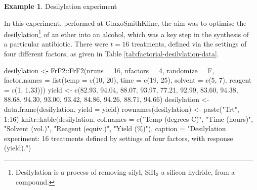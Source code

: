\documentclass[
]{book}
\newenvironment{Shaded}{\begin{snugshade}}{\end{snugshade}}
\newcommand{\AttributeTok}[1]{\textcolor[rgb]{0.77,0.63,0.00}{#1}}
\newcommand{\DecValTok}[1]{\textcolor[rgb]{0.00,0.00,0.81}{#1}}
\newcommand{\FloatTok}[1]{\textcolor[rgb]{0.00,0.00,0.81}{#1}}
\newcommand{\FunctionTok}[1]{\textcolor[rgb]{0.00,0.00,0.00}{#1}}
\newcommand{\NormalTok}[1]{#1}
\newcommand{\OtherTok}[1]{\textcolor[rgb]{0.56,0.35,0.01}{#1}}
\newcommand{\SpecialCharTok}[1]{\textcolor[rgb]{0.00,0.00,0.00}{#1}}
\newcommand{\StringTok}[1]{\textcolor[rgb]{0.31,0.60,0.02}{#1}}
\theoremstyle{definition}
\theoremstyle{definition}
\newtheorem{example}{Example}[chapter]
\theoremstyle{definition}
\theoremstyle{definition}
\theoremstyle{remark}
\begin{document}
\begin{example}
\protect\hypertarget{exm:factorial-desilylation}{}\label{exm:factorial-desilylation}Desilylation experiment \citep{Owen2001}

In this experiment, performed at GlaxoSmithKline, the aim was to optimise the desilylation\footnote{Desilylation is a process of removing silyl, SiH\(_3\) a silicon hydride, from a compound.} of an ether into an alcohol, which was a key step in the synthesis of a particular antibiotic. There were \(t=16\) treatments, defined via the settings of four different factors, as given in Table \ref{tab:factorial-desilylation-data}.

\begin{Shaded}
\begin{Highlighting}[]
\NormalTok{desilylation }\OtherTok{\textless{}{-}}\NormalTok{ FrF2}\SpecialCharTok{::}\FunctionTok{FrF2}\NormalTok{(}\AttributeTok{nruns =} \DecValTok{16}\NormalTok{, }\AttributeTok{nfactors =} \DecValTok{4}\NormalTok{, }\AttributeTok{randomize =}\NormalTok{ F,}
                           \AttributeTok{factor.names =} \FunctionTok{list}\NormalTok{(}\AttributeTok{temp =} \FunctionTok{c}\NormalTok{(}\DecValTok{10}\NormalTok{, }\DecValTok{20}\NormalTok{), }\AttributeTok{time =} \FunctionTok{c}\NormalTok{(}\DecValTok{19}\NormalTok{, }\DecValTok{25}\NormalTok{),}
                                               \AttributeTok{solvent =} \FunctionTok{c}\NormalTok{(}\DecValTok{5}\NormalTok{, }\DecValTok{7}\NormalTok{), }\AttributeTok{reagent =} \FunctionTok{c}\NormalTok{(}\DecValTok{1}\NormalTok{, }\FloatTok{1.33}\NormalTok{)))}
\NormalTok{yield }\OtherTok{\textless{}{-}} \FunctionTok{c}\NormalTok{(}\FloatTok{82.93}\NormalTok{, }\FloatTok{94.04}\NormalTok{, }\FloatTok{88.07}\NormalTok{, }\FloatTok{93.97}\NormalTok{, }\FloatTok{77.21}\NormalTok{, }\FloatTok{92.99}\NormalTok{, }\FloatTok{83.60}\NormalTok{, }\FloatTok{94.38}\NormalTok{, }
           \FloatTok{88.68}\NormalTok{, }\FloatTok{94.30}\NormalTok{, }\FloatTok{93.00}\NormalTok{, }\FloatTok{93.42}\NormalTok{, }\FloatTok{84.86}\NormalTok{, }\FloatTok{94.26}\NormalTok{, }\FloatTok{88.71}\NormalTok{, }\FloatTok{94.66}\NormalTok{)}
\NormalTok{desilylation }\OtherTok{\textless{}{-}} \FunctionTok{data.frame}\NormalTok{(desilylation, }\AttributeTok{yield =}\NormalTok{ yield)}
\FunctionTok{rownames}\NormalTok{(desilylation) }\OtherTok{\textless{}{-}} \FunctionTok{paste}\NormalTok{(}\StringTok{"Trt"}\NormalTok{, }\DecValTok{1}\SpecialCharTok{:}\DecValTok{16}\NormalTok{)}
\NormalTok{knitr}\SpecialCharTok{::}\FunctionTok{kable}\NormalTok{(desilylation, }
             \AttributeTok{col.names =} \FunctionTok{c}\NormalTok{(}\StringTok{"Temp (degrees C)"}\NormalTok{, }\StringTok{"Time (hours)"}\NormalTok{, }\StringTok{"Solvent (vol.)"}\NormalTok{, }
                           \StringTok{"Reagent (equiv.)"}\NormalTok{, }\StringTok{"Yield (\%)"}\NormalTok{),}
             \AttributeTok{caption =} \StringTok{"Desilylation experiment: 16 treatments defined }
\StringTok{             by settings of four factors, with response (yield)."}\NormalTok{)}
\end{Highlighting}
\end{Shaded}


\end{example}
\end{document}
